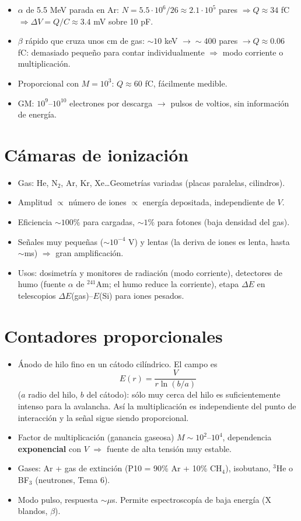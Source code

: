 \begin{clave}
\begin{itemize}
\item $\alpha$ de 5.5 MeV parada en Ar: $N=5.5\cdot10^6/26\approx2.1\cdot10^5$ pares $\Rightarrow Q\approx34$ fC $\Rightarrow\Delta V=Q/C\approx3.4$ mV sobre 10 pF.
\item $\beta$ rápido que cruza unos cm de gas: $\sim10$ keV $\to\sim400$ pares $\to Q\approx0.06$ fC: demasiado pequeño para contar
individualmente $\Rightarrow$ modo corriente o multiplicación.
\item Proporcional con $M=10^3$: $Q\approx60$ fC, fácilmente medible.
\item GM: $10^9$--$10^{10}$ electrones por descarga $\to$ pulsos de voltios, sin información de energía.
\end{itemize}
\end{clave}

\section{Cámaras de ionización}
\begin{itemize}
\item Gas: He, N$_2$, Ar, Kr, Xe\dots Geometrías variadas (placas paralelas, cilindros).
\item Amplitud $\propto$ número de iones $\propto$ energía depositada, independiente de $V$.
\item Eficiencia $\sim100\%$ para cargadas, $\sim1\%$ para fotones (baja densidad del gas).
\item Señales muy pequeñas ($\sim10^{-4}$ V) y lentas (la deriva de iones es lenta, hasta $\sim$ms) $\Rightarrow$ gran amplificación.
\item Usos: dosimetría y monitores de radiación (modo corriente), detectores de humo (fuente $\alpha$ de $^{241}$Am; el humo
reduce la corriente), etapa $\Delta E$ en telescopios $\Delta E$(gas)--$E$(Si) para iones pesados.
\end{itemize}

\section{Contadores proporcionales}
\begin{itemize}
\item Ánodo de hilo fino en un cátodo cilíndrico. El campo es
\[ E(r)=\frac{V}{r\ln(b/a)} \]
($a$ radio del hilo, $b$ del cátodo): sólo muy cerca del hilo es suficientemente intenso para la avalancha.
Así la multiplicación es independiente del punto de interacción y la señal sigue siendo proporcional.
\item Factor de multiplicación (ganancia gaseosa) $M\sim10^2$--$10^4$, dependencia \textbf{exponencial} con $V$
$\Rightarrow$ fuente de alta tensión muy estable.
\item Gases: Ar + gas de extinción (P10 = 90\% Ar + 10\% CH$_4$), isobutano, $^3$He o BF$_3$ (neutrones, Tema 6).
\item Modo pulso, respuesta $\sim\mu$s. Permite espectroscopía de baja energía (X blandos, $\beta$).
\end{itemize}

